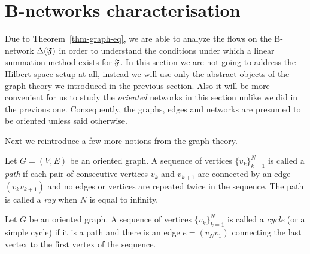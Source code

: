 \documentclass[12pt]{amsart}
\begin{document}
  \section{B-networks characterisation}
    Due to Theorem~\ref{thm-graph-eq}, we are able to analyze the flows on the B-network
      $\Delta(\mathfrak{F})$ in order to understand the conditions under which a linear summation method exists for $\mathfrak{F}$.
    In this section we are not going to address the Hilbert space setup at all,
      instead we will use only the abstract objects of the graph theory we introduced in the previous section.
    Also it will be more convenient for us to study the \emph{oriented} networks in this section unlike we
      did in the previous one.
    Consequently, the graphs, edges and networks are presumed to be oriented unless said otherwise.

    Next we reintroduce a few more notions from the graph theory.
    \begin{definition}
      Let $G = (V, E)$ be an oriented graph.
      A sequence of vertices $\{v_k\}_{k=1}^N$ is called a \emph{path} if each pair of consecutive vertices
        $v_k$ and $v_{k+1}$ are connected by an edge $(v_k v_{k+1})$ and no edges or vertices are repeated twice in the sequence.
      The path is called a \emph{ray} when $N$ is equal to infinity.
    \end{definition}
    \begin{definition}
      Let $G$ be an oriented graph.
      A sequence of vertices $\{v_k\}_{k=1}^N$ is called a \emph{cycle} (or a simple cycle) if it is
        a path and there is an edge $e = (v_N v_1)$ connecting the last vertex to the first vertex of the sequence.
    \end{definition}
\end{document}
